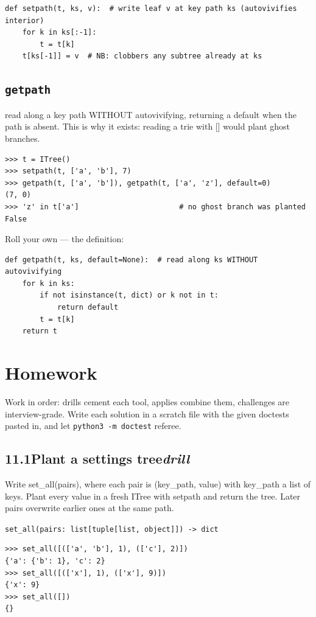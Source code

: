 \documentclass[10pt,letterpaper]{book}
\begin{document}
\begin{lstlisting}[style=ex]
def setpath(t, ks, v):  # write leaf v at key path ks (autovivifies interior)
    for k in ks[:-1]:
        t = t[k]
    t[ks[-1]] = v  # NB: clobbers any subtree already at ks
\end{lstlisting}
\subsection{\texttt{getpath}}\label{def:getpath}
read along a key path WITHOUT autovivifying, returning a default when the path is absent. This is why it exists: reading a trie with [] would plant ghost branches.
\begin{lstlisting}[style=ex]
>>> t = ITree()
>>> setpath(t, ['a', 'b'], 7)
>>> getpath(t, ['a', 'b']), getpath(t, ['a', 'z'], default=0)
(7, 0)
>>> 'z' in t['a']                       # no ghost branch was planted
False
\end{lstlisting}

Roll your own --- the definition:

\begin{lstlisting}[style=ex]
def getpath(t, ks, default=None):  # read along ks WITHOUT autovivifying
    for k in ks:
        if not isinstance(t, dict) or k not in t:
            return default
        t = t[k]
    return t
\end{lstlisting}
\section{Homework}
Work in order: drills cement each tool, applies combine them,
challenges are interview-grade. Write each solution in a scratch file with
the given doctests pasted in, and let \texttt{python3 -m doctest} referee.
\subsection*{11.1\quad Plant a settings tree\hfill\textnormal{\textit{drill}}}
Write set\_all(pairs), where each pair is (key\_path, value) with key\_path a list of keys. Plant every value in a fresh ITree with setpath and return the tree. Later pairs overwrite earlier ones at the same path.

\noindent\texttt{set\_all(pairs: list[tuple[list, object]]) -> dict}
\begin{lstlisting}[style=ex]
>>> set_all([(['a', 'b'], 1), (['c'], 2)])
{'a': {'b': 1}, 'c': 2}
>>> set_all([(['x'], 1), (['x'], 9)])
{'x': 9}
>>> set_all([])
{}
\end{lstlisting}
\end{document}
